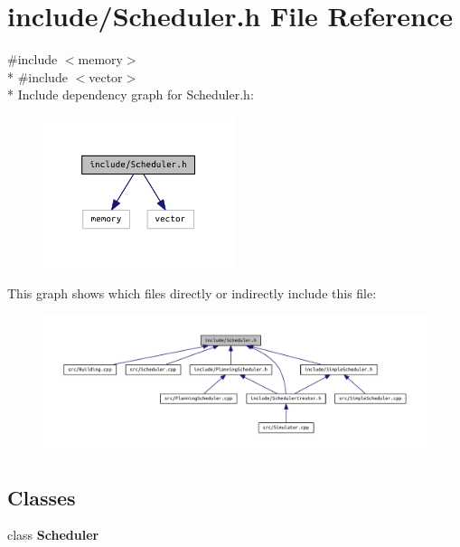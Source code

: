 \section{include/\+Scheduler.h File Reference}
\label{_scheduler_8h}
{\ttfamily \#include $<$memory$>$}\\*
{\ttfamily \#include $<$vector$>$}\\*
Include dependency graph for Scheduler.\+h\+:\nopagebreak
\begin{figure}[H]
\begin{center}
\leavevmode
\includegraphics[width=158pt]{_scheduler_8h__incl}
\end{center}
\end{figure}
This graph shows which files directly or indirectly include this file\+:\nopagebreak
\begin{figure}[H]
\begin{center}
\leavevmode
\includegraphics[width=350pt]{_scheduler_8h__dep__incl}
\end{center}
\end{figure}
\subsection*{Classes}
\begin{DoxyCompactItemize}
\item 
class {\bf Scheduler}
\end{DoxyCompactItemize}
